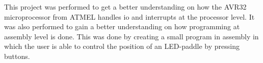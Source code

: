 This project was performed to get a better understanding on how the
AVR32 microprocessor from ATMEL handles io and interrupts at the
processor level. It was also performed to gain a better understanding on
how programming at assembly level is done. This was done by creating a
small program in assembly in which the user is able to control the
position of an LED-paddle by pressing buttons. 

\begin{comment}
TODO:
- hva fant vi ut av?
- rask konklusjon 
\end{comment}

